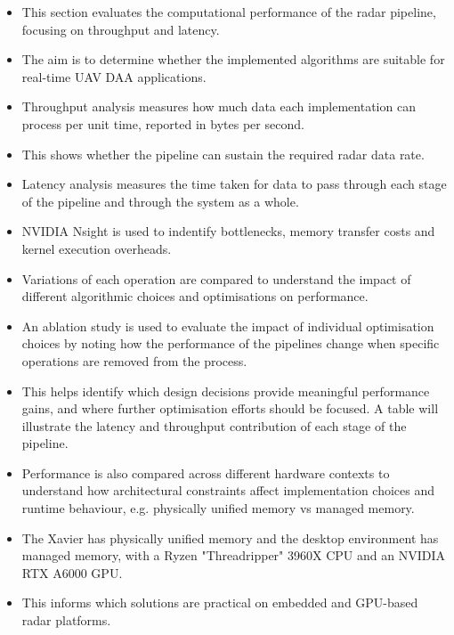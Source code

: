 \begin{itemize}
    \item This section evaluates the computational performance of the radar pipeline, focusing on throughput and latency.
    \item The aim is to determine whether the implemented algorithms are suitable for real-time UAV DAA applications.
    \item Throughput analysis measures how much data each implementation can process per unit time, reported in bytes per second.
    \item This shows whether the pipeline can sustain the required radar data rate.
    \item Latency analysis measures the time taken for data to pass through each stage of the pipeline and through the system as a whole.
    \item NVIDIA Nsight is used to indentify bottlenecks, memory transfer costs and kernel execution overheads.
    \item Variations of each operation are compared to understand the impact of different algorithmic choices and optimisations on performance. 
    \item An ablation study is used to evaluate the impact of individual optimisation choices by noting how the performance of the pipelines change when specific operations are removed from the process.
    \item This helps identify which design decisions provide meaningful performance gains, and where further optimisation efforts should be focused. A table will illustrate the latency and throughput contribution of each stage of the pipeline.  
    \item Performance is also compared across different hardware contexts to understand how architectural constraints affect implementation choices and runtime behaviour, e.g. physically unified memory vs managed memory.
    \item The Xavier has physically unified memory and the desktop environment has managed memory, with a Ryzen "Threadripper" 3960X CPU and an NVIDIA RTX A6000 GPU.  
    \item This informs which solutions are practical on embedded and GPU-based radar platforms.
\end{itemize}